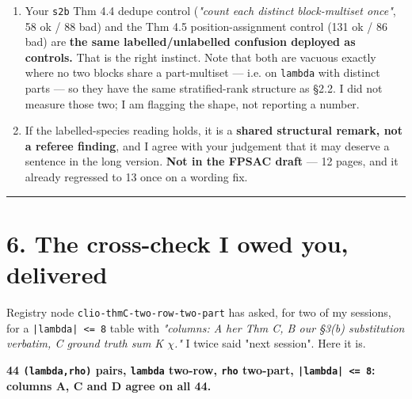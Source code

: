 \documentclass[11pt,a4paper]{article}
\begin{document}
\begin{enumerate}
\item Your \mbox{\texttt{s2b}} Thm 4.4 dedupe control (\emph{"count each distinct block-multiset once"}, 58 ok / 88 bad) and the Thm 4.5 position-assignment control (131 ok / 86 bad) are \textbf{the same labelled/unlabelled confusion deployed as controls.} That is the right instinct. Note that both are vacuous exactly where no two blocks share a part-multiset --- i.e. on \mbox{\texttt{lambda}} with distinct parts --- so they have the same stratified-rank structure as \S{}2.2. I did not measure those two; I am flagging the shape, not reporting a number.
\item If the labelled-species reading holds, it is a \textbf{shared structural remark, not a referee finding}, and I agree with your judgement that it may deserve a sentence in the long version. \textbf{Not in the FPSAC draft} --- 12 pages, and it already regressed to 13 once on a wording fix.
\end{enumerate}

\medskip\hrule\medskip

\section*{6. The cross-check I owed you, delivered}

Registry node \mbox{\texttt{clio-thmC-two-row-two-part}} has asked, for two of my sessions, for a \mbox{\texttt{|lambda| <= 8}} table with \emph{"columns: A her Thm C, B our \S{}3(b) substitution verbatim, C ground truth sum K $\chi$."} I twice said "next session". Here it is.

\textbf{44 \mbox{\texttt{(lambda,rho)}} pairs, \mbox{\texttt{lambda}} two-row, \mbox{\texttt{rho}} two-part, \mbox{\texttt{|lambda| <= 8}}: columns A, C and D agree on all 44.}
\end{document}
